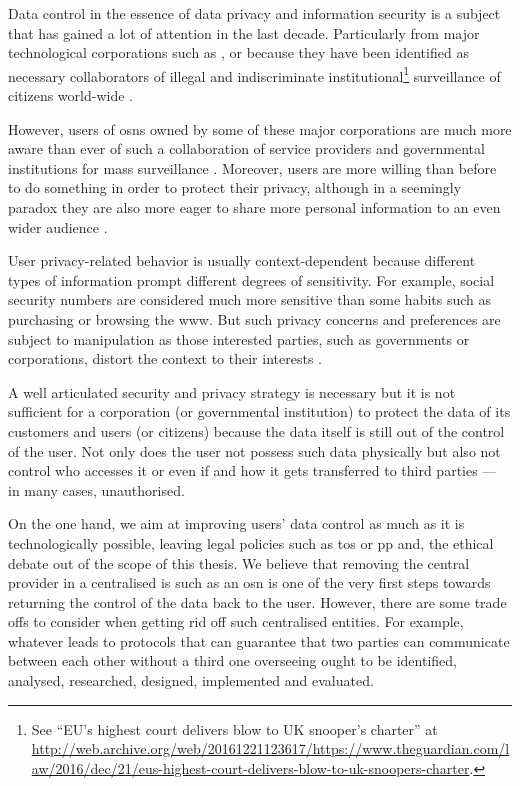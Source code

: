 Data control in the essence of data privacy and information security is a 
subject that has gained a lot of attention in the last decade. Particularly from 
major technological corporations such as \Google, \Apple or \Facebook because they 
have been identified as necessary collaborators of illegal and indiscriminate institutional\footnote{See 
``EU's highest court delivers blow to UK snooper's charter'' at \url{http://web.archive.org/web/20161221123617/https://www.theguardian.com/law/2016/dec/21/eus-highest-court-delivers-blow-to-uk-snoopers-charter}.} 
surveillance of citizens world-wide \cite{Lyon14}.

However, users of \acp{osn} owned by some of these major corporations are much more 
aware than ever of such a collaboration of service providers and governmental institutions 
for mass surveillance \cite{Madden14}. Moreover, users are more willing than before 
to do something in order to protect their privacy, although in a seemingly paradox 
they are also more eager to share more personal information to an even wider audience 
\cite{StutzmanGA13}. 

User privacy-related behavior is usually context-dependent because different types 
of information prompt different degrees of sensitivity. For example, social security 
numbers are considered much more sensitive than some habits such as purchasing or 
browsing the \ac{www}. But such privacy concerns and preferences are subject to 
manipulation as those interested parties, such as governments or corporations, distort 
the context to their interests \cite{AcquistiBL15}.

A well articulated security and privacy strategy is necessary but it is not sufficient 
for a corporation (or governmental institution) to protect the data of its customers 
and users (or citizens) because the data itself is still out of the control of the 
user. Not only does the user not possess such data physically but also not 
control who accesses it or even if and how it gets transferred to third parties --- 
in many cases, unauthorised.

On the one hand, we aim at improving users' data control as much as it is technologically 
possible, leaving legal policies such as \ac{tos} or \ac{pp} and, the ethical debate 
out of the scope of this thesis. We believe that removing the central provider in 
a centralised \ac{is} such as an \ac{osn} is one of the very first steps towards 
returning the control of the data back to the user. However, there are some trade 
offs to consider when getting rid off such centralised entities. For example, whatever
leads to protocols that can guarantee that two parties can communicate between each 
other without a third one overseeing ought to be identified, analysed, researched, 
designed, implemented and evaluated.

